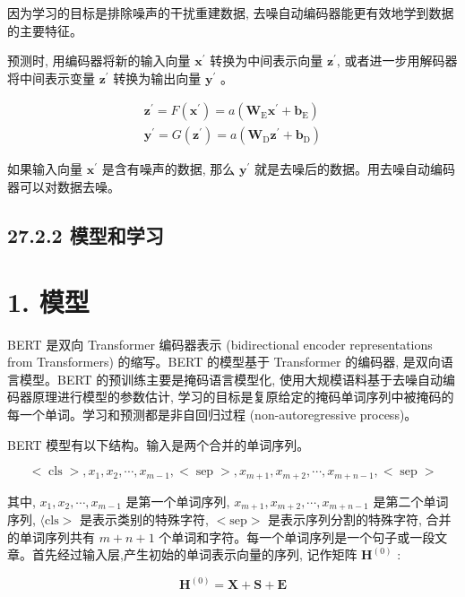 \documentclass[10pt]{article}
\begin{document}
因为学习的目标是排除噪声的干扰重建数据, 去噪自动编码器能更有效地学到数据的主要特征。

预测时, 用编码器将新的输入向量 $\boldsymbol{x}^{\prime}$ 转换为中间表示向量 $\boldsymbol{z}^{\prime}$, 或者进一步用解码器将中间表示变量 $\boldsymbol{z}^{\prime}$ 转换为输出向量 $\boldsymbol{y}^{\prime}$ 。

\[
\begin{array}{r}
\boldsymbol{z}^{\prime}=F\left(\boldsymbol{x}^{\prime}\right)=a\left(\boldsymbol{W}_{\mathrm{E}} \boldsymbol{x}^{\prime}+\boldsymbol{b}_{\mathrm{E}}\right) \\
\boldsymbol{y}^{\prime}=G\left(\boldsymbol{z}^{\prime}\right)=a\left(\boldsymbol{W}_{\mathrm{D}} \boldsymbol{z}^{\prime}+\boldsymbol{b}_{\mathrm{D}}\right) \tag{27.21}
\end{array}
\]

如果输入向量 $\boldsymbol{x}^{\prime}$ 是含有噪声的数据, 那么 $\boldsymbol{y}^{\prime}$ 就是去噪后的数据。用去噪自动编码器可以对数据去噪。

\subsection*{27.2.2 模型和学习}
\section*{1. 模型}
BERT 是双向 Transformer 编码器表示 (bidirectional encoder representations from Transformers) 的缩写。BERT 的模型基于 Transformer 的编码器, 是双向语言模型。BERT 的预训练主要是掩码语言模型化, 使用大规模语料基于去噪自动编码器原理进行模型的参数估计, 学习的目标是复原给定的掩码单词序列中被掩码的每一个单词。学习和预测都是非自回归过程 (non-autoregressive process)。

BERT 模型有以下结构。输入是两个合并的单词序列。

$$
<\operatorname{cls}>, x_{1}, x_{2}, \cdots, x_{m-1},<\operatorname{sep}>, x_{m+1}, x_{m+2}, \cdots, x_{m+n-1},<\operatorname{sep}>
$$

其中, $x_{1}, x_{2}, \cdots, x_{m-1}$ 是第一个单词序列, $x_{m+1}, x_{m+2}, \cdots, x_{m+n-1}$ 是第二个单词序列, $\langle\mathrm{cls}>$ 是表示类别的特殊字符, $<\mathrm{sep}>$ 是表示序列分割的特殊字符, 合并的单词序列共有 $m+n+1$ 个单词和字符。每一个单词序列是一个句子或一段文章。首先经过输入层,产生初始的单词表示向量的序列, 记作矩阵 $\boldsymbol{H}^{(0)}$ :


\begin{equation*}
\boldsymbol{H}^{(0)}=\boldsymbol{X}+\boldsymbol{S}+\boldsymbol{E} \tag{27.22}
\end{equation*}
\end{document}
